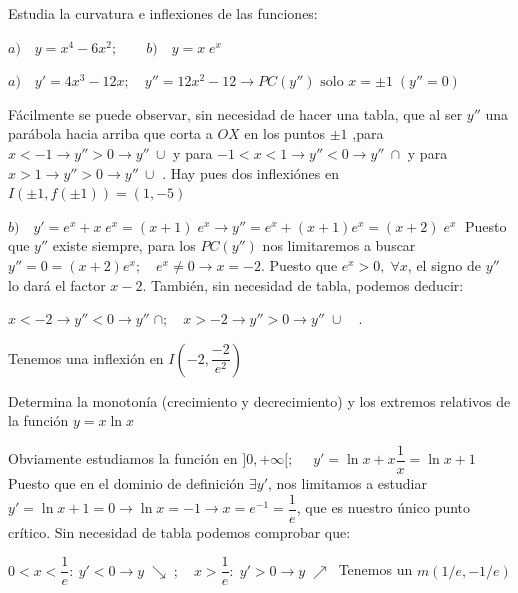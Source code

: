 	\begin{ejre}
		Estudia la curvatura e inflexiones de las funciones:
		
		$a)\quad y=x^4-6x^2; \qquad b)\quad y=x\; e^x$
	\end{ejre}
	
	\begin{proofw}\renewcommand{\qedsymbol}{$\diamond$}
	
	\hspace{5mm} $a)\quad y'=4x^3-12x; \quad y''=12x^2-12 \to PC(y'') \mbox{ solo } x=\pm 1 \; (y''=0)$
	
	Fácilmente se puede observar, sin necesidad de hacer una tabla, que al ser $y''$ una parábola hacia arriba que corta a $OX$ en los  puntos $\pm 1$ ,para $x<-1 \to y''>0 \to y''\: \cup $ y para $-1<x<1 \to y''<0 \to y''\: \cap $ y para $x>1 \to y''>0 \to y''\: \cup $ . Hay pues dos inflexiónes en $I(\pm 1,f(\pm 1))=(1,-5)$
	
	\vspace{3mm}
	
	$b)\quad y'=e^x+x\;e^x=(x+1)\; e^x \to y''=e^x+(x+1)e^x=(x+2)\; e^x\; $ Puesto que $y''$ existe siempre, para los $PC(y'')$ nos limitaremos a buscar $y''=0=(x+2)e^x; \quad e^x \neq 0 \to x=-2$. Puesto que $e^x >0,\; \forall x$, el signo de $y''$ lo dará el factor $x-2$. También, sin necesidad de tabla, podemos deducir:
	
	$x<-2 \to y''<0\to y''\; \cap; \quad x>-2 \to y''>0 \to y''\; \cup \quad$. 
	
	Tenemos una inflexión en $I \left( -2,\dfrac{-2}{e^2} \right)$
	
	\end{proofw}
	
	\begin{ejre}
		Determina la monotonía (crecimiento y decrecimiento) y los extremos relativos de la función $y=x\ln x$
	\end{ejre}
	
	\begin{proofw}\renewcommand{\qedsymbol}{$\diamond$}
	
	Obviamente estudiamos la función en $]0,+\infty[; \quad $ $y'=\ln x +x \dfrac 1 x = \ln x +1$	 Puesto que en el dominio de definición $\exists y'$, nos limitamos a estudiar $y'=\ln x+1=0 \to \ln x=-1 \to x=e^{-1}=\dfrac 1 e $, que es nuestro único punto crítico. Sin necesidad de tabla podemos comprobar que:
	
	$0<x<\dfrac 1 e:\: y'<0 \to y\; \searrow \; ; \quad x>\dfrac 1 e :\; y'>0 \to y\; \nearrow \; \; $Tenemos un $m(1/e,-1/e)$
	
	\end{proofw}


